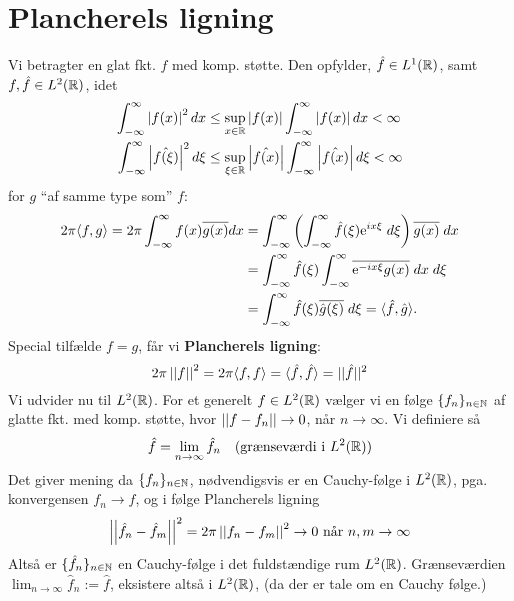 \chapter{Plancherels ligning}
Vi betragter en glat fkt. $f$ med komp. støtte. Den opfylder, $\hat{f} \in L^{1}(\mathbb{R})$, samt $f, \hat{f} \in L^{2}(\mathbb{R})$, idet
\begin{align*}
\int_{-\infty}^{\infty} \left|f(x)\right|^{2} dx &\leq \sup_{x \in \mathbb{R}} \left|f(x)\right| \int_{-\infty}^{\infty} \left|f(x)\right| dx < \infty\\
\int_{-\infty}^{\infty} \left|\hat{f(\xi)}\right|^{2} d\xi &\leq \sup_{\xi \in \mathbb{R}} \left|\hat{f(x)}\right| \int_{-\infty}^{\infty} \left|\hat{f(x)}\right| d\xi < \infty
\end{align*}
for $g$ ``af samme type som'' $f$:
\begin{align*}
  2\pi \langle f, g\rangle = 2\pi \int_{-\infty}^{\infty} f(x) \overline{g(x)} dx &= \int_{-\infty}^{\infty} \left( \int_{-\infty}^{\infty} \hat{f}(\xi) \mathrm{e}^{ix \xi} \; d \xi \right) \overline{g(x)} \; dx \\
  &= \int_{-\infty}^{\infty} \hat{f}(\xi) \int_{-\infty}^{\infty} \overline{\mathrm{e}^{-ix \xi} g(x)} \; dx \; d\xi \\
  &= \int_{-\infty}^{\infty} \hat{f}(\xi) \overline{\hat{g}(\xi)} \; d \xi = \langle\hat{f}, \hat{g}\rangle.
\end{align*}
Special tilfælde $f = g$, får vi \textbf{Plancherels ligning}:
\begin{equation*}
2\pi \left|\left|f\right|\right|^{2} = 2\pi \langle f, f\rangle = \langle\hat{f}, \hat{f}\rangle = \lvert \lvert \hat{f} \rvert \rvert^{2}
\end{equation*}
Vi udvider nu til $L^{2}(\mathbb{R})$. For et generelt $f \in L^{2}(\mathbb{R})$ vælger vi en følge $\{f_{n}\}_{n \in \mathbb{N}}$ af glatte fkt. med komp. støtte, hvor $\left|\left|f - f_{n}\right|\right| \to 0$, når $n \to \infty$.
Vi definiere så
\begin{equation*}
  \hat{f} = \lim_{n \to \infty} \hat{f}_{n} \quad \text{(grænseværdi i $L^{2}(\mathbb{R})$)}
\end{equation*}
Det giver mening da $\{f_{n}\}_{n \in \mathbb{N}}$, nødvendigsvis er en Cauchy-følge i $L^{2}(\mathbb{R})$, pga. konvergensen $f_{n} \to f$, og i følge Plancherels ligning
\begin{equation*}
  \left|\left|\hat{f}_{n} - \hat{f}_{m}\right|\right|^{2} = 2\pi \left|\left|f_{n} - f_{m}\right|\right|^{2} \to 0 \text{ når } n, m \to \infty
\end{equation*}
Altså er $\{\hat{f}_{n}\}_{n \in \mathbb{N}}$ en Cauchy-følge i det fuldstændige rum $L^{2}(\mathbb{R})$. Grænseværdien $\lim_{n \to \infty} \hat{f}_{n} := \hat{f}$, eksistere altså i $L^{2}(\mathbb{R})$, (da der er tale om en Cauchy følge.) \\

